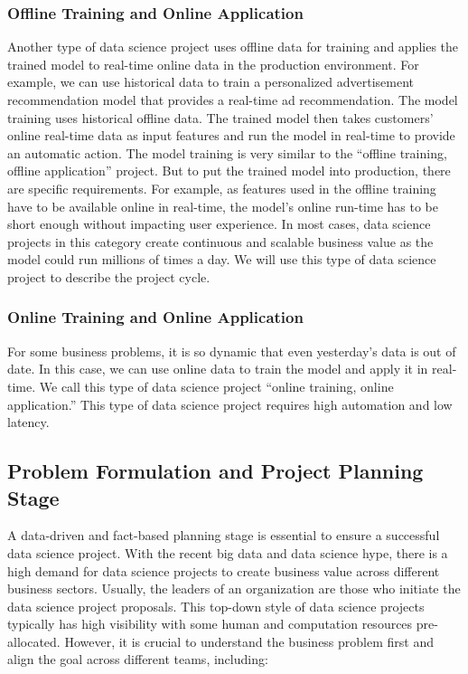 \documentclass[
  12pt,
]{krantz}
\begin{document}
\hypertarget{offline-training-and-online-application}{%
\subsubsection{Offline Training and Online Application}\label{offline-training-and-online-application}}

Another type of data science project uses offline data for training and applies the trained model to real-time online data in the production environment. For example, we can use historical data to train a personalized advertisement recommendation model that provides a real-time ad recommendation. The model training uses historical offline data. The trained model then takes customers' online real-time data as input features and run the model in real-time to provide an automatic action. The model training is very similar to the ``offline training, offline application'' project. But to put the trained model into production, there are specific requirements. For example, as features used in the offline training have to be available online in real-time, the model's online run-time has to be short enough without impacting user experience. In most cases, data science projects in this category create continuous and scalable business value as the model could run millions of times a day. We will use this type of data science project to describe the project cycle.

\hypertarget{online-training-and-online-application}{%
\subsubsection{Online Training and Online Application}\label{online-training-and-online-application}}

For some business problems, it is so dynamic that even yesterday's data is out of date. In this case, we can use online data to train the model and apply it in real-time. We call this type of data science project ``online training, online application.'' This type of data science project requires high automation and low latency.

\hypertarget{problem-formulation-and-project-planning-stage}{%
\subsection{Problem Formulation and Project Planning Stage}\label{problem-formulation-and-project-planning-stage}}

A data-driven and fact-based planning stage is essential to ensure a successful data science project. With the recent big data and data science hype, there is a high demand for data science projects to create business value across different business sectors. Usually, the leaders of an organization are those who initiate the data science project proposals. This top-down style of data science projects typically has high visibility with some human and computation resources pre-allocated. However, it is crucial to understand the business problem first and align the goal across different teams, including:
\end{document}
